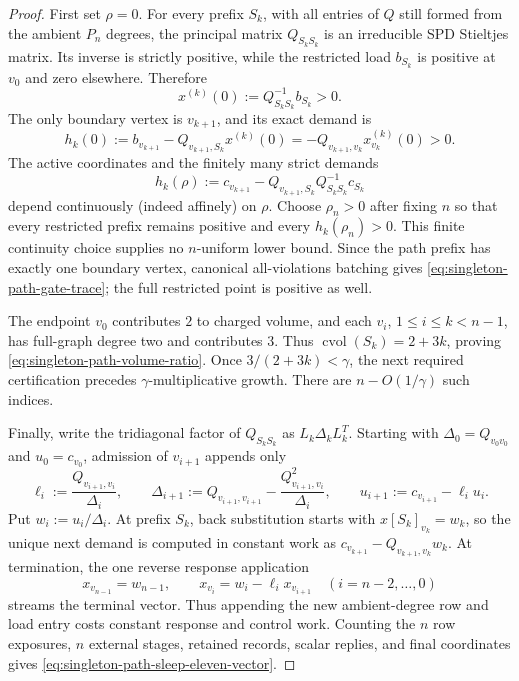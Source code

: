 \begin{proof}
First set $\rho=0$.  For every prefix $S_k$, with all entries of $Q$ still
formed from the ambient $P_n$ degrees, the principal matrix
$Q_{S_kS_k}$ is an irreducible SPD Stieltjes matrix.  Its inverse is strictly
positive, while the restricted load $b_{S_k}$ is positive at $v_0$ and zero
elsewhere.  Therefore
\begin{equation*}
 x^{(k)}(0):=Q_{S_kS_k}^{-1}b_{S_k}>0.
\end{equation*}
The only boundary vertex is $v_{k+1}$, and its exact demand is
\begin{equation*}
 h_k(0)
 :=b_{v_{k+1}}-Q_{v_{k+1},S_k}x^{(k)}(0)
 =-Q_{v_{k+1},v_k}x^{(k)}_{v_k}(0)>0.
\end{equation*}
The active coordinates and the finitely many strict demands
\begin{equation*}
 h_k(\rho)
 :=c_{v_{k+1}}-Q_{v_{k+1},S_k}
 Q_{S_kS_k}^{-1}c_{S_k}
\end{equation*}
depend continuously (indeed affinely) on $\rho$.  Choose $\rho_n>0$ after
fixing $n$ so that every restricted prefix remains positive and every
$h_k(\rho_n)>0$.  This finite continuity choice supplies no $n$-uniform
lower bound.  Since the path prefix has exactly one boundary vertex,
canonical all-violations batching gives
\cref{eq:singleton-path-gate-trace}; the full restricted point is positive as
well.

The endpoint $v_0$ contributes $2$ to charged volume, and each
$v_i$, $1\leq i\leq k<n-1$, has full-graph degree two and contributes $3$.
Thus $\operatorname{cvol}(S_k)=2+3k$, proving
\cref{eq:singleton-path-volume-ratio}.  Once
$3/(2+3k)<\gamma$, the next required certification precedes
$\gamma$-multiplicative growth.  There are $n-O(1/\gamma)$ such indices.

Finally, write the tridiagonal factor of $Q_{S_kS_k}$ as
$L_k\Delta_kL_k^T$.  Starting with
$\Delta_0=Q_{v_0v_0}$ and $u_0=c_{v_0}$, admission of $v_{i+1}$ appends only
\begin{equation*}
 \ell_i:=\frac{Q_{v_{i+1},v_i}}{\Delta_i},
 \qquad
 \Delta_{i+1}:=Q_{v_{i+1},v_{i+1}}
   -\frac{Q_{v_{i+1},v_i}^2}{\Delta_i},
 \qquad
 u_{i+1}:=c_{v_{i+1}}-\ell_i u_i.
\end{equation*}
Put $w_i:=u_i/\Delta_i$.  At prefix $S_k$, back substitution starts with
$x[S_k]_{v_k}=w_k$, so the unique next demand is computed in constant work as
$c_{v_{k+1}}-Q_{v_{k+1},v_k}w_k$.  At termination, the one reverse response
application
\begin{equation*}
 x_{v_{n-1}}=w_{n-1},
 \qquad
 x_{v_i}=w_i-\ell_i x_{v_{i+1}}
 \quad(i=n-2,\ldots,0)
\end{equation*}
streams the terminal vector.  Thus appending the new ambient-degree row and
load entry costs constant response and control work.  Counting the $n$ row
exposures, $n$ external stages, retained records, scalar replies, and final
coordinates gives \cref{eq:singleton-path-sleep-eleven-vector}.
\end{proof}

